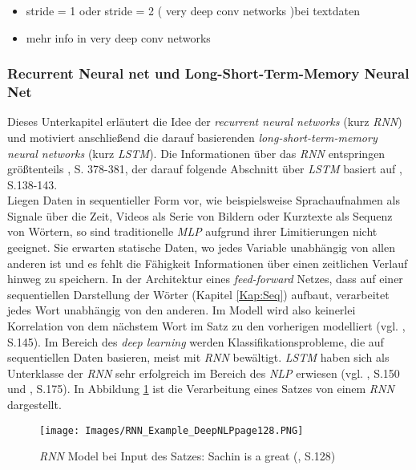 \documentclass[a4paper,11pt]{article}
\begin{document}
\begin{itemize}
    \item stride = 1 oder stride = 2 ( very deep conv networks )bei textdaten
    \item mehr info in very deep conv networks
\end{itemize}{}



\subsubsection{Recurrent Neural net und Long-Short-Term-Memory Neural Net} \label{kap:LSTM}

Dieses Unterkapitel erläutert die Idee der \textit{recurrent neural networks} (kurz \textit{RNN}) und motiviert anschließend die darauf basierenden \textit{long-short-term-memory neural networks} (kurz \textit{LSTM}). Die Informationen über das \textit{RNN} entspringen größtenteils \cite{deepL}, S. 378-381, der darauf folgende Abschnitt über \textit{LSTM} basiert auf \cite{deepNLP}, S.138-143.\\

Liegen Daten in sequentieller Form vor, wie beispielsweise Sprachaufnahmen als Signale über die Zeit, Videos als Serie von Bildern oder Kurztexte als Sequenz von Wörtern, so sind traditionelle \textit{MLP} aufgrund ihrer Limitierungen nicht geeignet. Sie erwarten statische Daten, wo jedes Variable unabhängig von allen anderen ist und es fehlt die Fähigkeit Informationen über einen zeitlichen Verlauf hinweg zu speichern. In der Architektur eines \textit{feed-forward} Netzes, dass auf einer sequentiellen Darstellung der Wörter (Kapitel \ref{Kap:Seq}) aufbaut, verarbeitet jedes Wort unabhängig von den anderen. Im Modell wird also keinerlei Korrelation von dem nächstem Wort im Satz zu den vorherigen modelliert (vgl. \cite{deepEssentials}, S.145). Im Bereich des \textit{deep learning} werden Klassifikationsprobleme, die auf sequentiellen Daten basieren, meist mit \textit{RNN} bewältigt. \textit{LSTM} haben sich als Unterklasse der \textit{RNN} sehr erfolgreich im Bereich des \textit{NLP} erwiesen (vgl. \cite{deepEssentials}, S.150 und \cite{keras}, S.175). In Abbildung \ref{abb:RNNExample} ist die Verarbeitung eines Satzes von einem \textit{RNN} dargestellt.

\begin{figure}[!ht]
\begin{center}
\texttt{[image: Images/RNN\_Example\_DeepNLPpage128.PNG]}
\caption{\textit{RNN} Model bei Input des Satzes: Sachin is a great (\cite{deepNLP}, S.128)}
\label{abb:RNNExample}
\end{center}
\end{figure}
\end{document}
